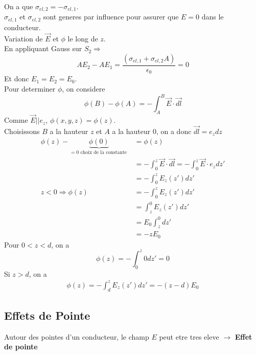 \documentclass[../main.tex]{subfiles}
\begin{document}
\begin{exemple}
On a que  $\sigma_{el,2} = - \sigma_{el,1} $.\\
$\sigma_{el,1} $ et $\sigma_{el,2} $ sont generes par influence pour assurer que $E=0$ dans le conducteur.\\
Variation de $\vec{E}$ et $\phi$ le long de $z$.\\
En  appliquant Gauss sur $S_2 \Rightarrow $ 
\[ 
	A E_2 - A E_1 = \frac{( \sigma_{el,1} + \sigma_{el,2} A) }{\epsilon_0}=0
\]
Et donc $E_1=  E_2 = E_0$.\\
Pour determiner $\phi$, on considere
\[ 
	\phi(B) - \phi( A)  = - \int_{ A }^{ B } \vec{E} \cdot \vec{dl}
\]
Comme $\vec{E} || e_z$, $\phi( x,y,z) = \phi( z) $.\\
Choisissons $B$ a la hauteur $z$ et $A$ a la hauteur $0$, on a donc $\vec{dl} = e_z dz$
\begin{align*}
	\phi( z) - \underbrace{\phi( 0)}_{=0 \text{ choix de la constante } } &= \phi( z) \\
	&= -\int_{ 0  }^{ z } \vec{E} \cdot \vec{dl} = - \int_{ 0 }^{ z } \vec{E} \cdot e_z dz'\\
	&= - \int_{ 0 }^{ z } E_z( z') dz'\\
	z<0 \Rightarrow \phi( z) &= - \int_{ 0 }^{ z } E_z (z') dz'\\
				 &= \int_{ z }^{ 0 }E_z( z') dz'\\
				 &= E_0 \int_{ z }^{ 0 } dz'\\
				 &= -z E_0
\end{align*}
Pour $0<z<d $, on a
\[ 
	\phi( z) = - \int_{ 0 }^{ z } 0 dz' = 0
\]
Si $z>d$, on a
\begin{align*}
	\phi( z) = - \int_{ d }^{ z } E_z( z')  dz' = - ( z-d) E_0
\end{align*}
\end{exemple}
\subsection{Effets de Pointe}
Autour des pointes d'un conducteur, le champ $E$ peut etre tres eleve $\to $ \textbf { Effet de pointe}	\\
\end{document}
